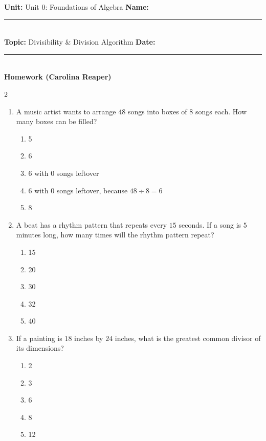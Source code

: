 \documentclass[10pt]{article}
\begin{document}
\enlargethispage{2.5cm}

\begin{tcolorbox}[colback=mainblue!5, colframe=mainblue, sharp corners, boxrule=0.5pt]
    \small \textbf{Unit:} Unit 0: Foundations of Algebra \hfill \textbf{Name:} \rule{3cm}{0.4pt} \\
    \small \textbf{Topic:} Divisibility & Division Algorithm \hfill \textbf{Date:} \rule{2cm}{0.4pt} \\
    \centering \textbf{\large Homework (Carolina Reaper)}
\end{tcolorbox}

\vspace{0.2cm}

\begin{multicols}{2}
\begin{enumerate}[label=\textbf{Q\arabic*.}, leftmargin=*, itemsep=6pt, parsep=0pt]

  \item \small A music artist wants to arrange $48$ songs into boxes of $8$ songs each. How many boxes can be filled?
  \begin{enumerate}[label=(\Alph*), leftmargin=0.6cm, nosep, itemsep=2pt]
    \item 5
    \item 6
    \item 6 with 0 songs leftover
    \item 6 with 0 songs leftover, because $48 \div 8 = 6$
    \item 8
  \end{enumerate}

  \item \small A beat has a rhythm pattern that repeats every $15$ seconds. If a song is $5$ minutes long, how many times will the rhythm pattern repeat?
  \begin{enumerate}[label=(\Alph*), leftmargin=0.6cm, nosep, itemsep=2pt]
    \item 15
    \item 20
    \item 30
    \item 32
    \item 40
  \end{enumerate}

  \item \small If a painting is $18$ inches by $24$ inches, what is the greatest common divisor of its dimensions?
  \begin{enumerate}[label=(\Alph*), leftmargin=0.6cm, nosep, itemsep=2pt]
    \item 2
    \item 3
    \item 6
    \item 8
    \item 12
  \end{enumerate}


\end{enumerate}
\end{multicols}
\end{document}
